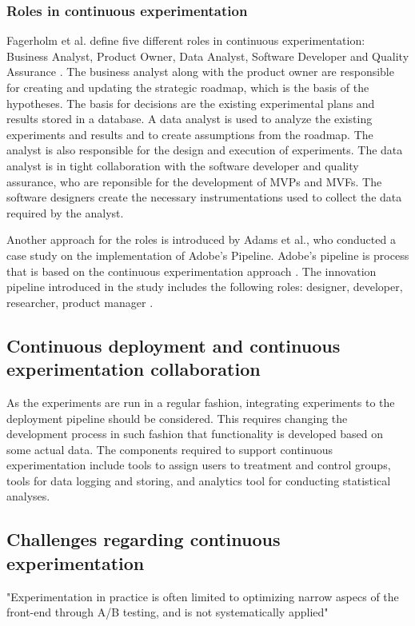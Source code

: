 \documentclass[english]{tktltiki2}
\theoremstyle{definition}
\theoremstyle{remark}
\begin{document}
\subsubsection{Roles in continuous experimentation}
Fagerholm et al. define five different roles in continuous experimentation: Business Analyst, Product Owner, Data Analyst, Software Developer and Quality Assurance \cite{fagerholm2014building}. The business analyst along with the product owner are responsible for creating and updating the strategic roadmap, which is the basis of the hypotheses. The basis for decisions are the existing experimental plans and results stored in a database. A data analyst is used to analyze the existing experiments and results and to create assumptions from the roadmap. The analyst is also responsible for the design and execution of experiments. The data analyst is in tight collaboration with the software developer and quality assurance, who are reponsible for the development of MVPs and MVFs. The software designers create the necessary instrumentations used to collect the data required by the analyst.



Another approach for the roles is introduced by Adams et al., who conducted a case study on the implementation of Adobe's Pipeline. Adobe's pipeline is process that is based on the continuous experimentation approach \cite{adams2013creating, adobe}. The innovation pipeline introduced in the study includes the following roles: designer, developer, researcher, product manager \cite{adobe}.

\subsection{Continuous deployment and continuous experimentation collaboration}
As the experiments are run in a regular fashion, integrating experiments to the deployment pipeline should be considered. This requires changing the development process in such fashion that functionality is developed based on some actual data. The components required to support continuous experimentation include tools to assign users to treatment and control groups, tools for data logging and storing, and analytics tool for conducting statistical analyses.

\subsection{Challenges regarding continuous experimentation}
"Experimentation in practice is often limited to optimizing narrow aspecs of the front-end through A/B testing, and is not systematically applied" \cite{bosch2012building} 
\end{document}

